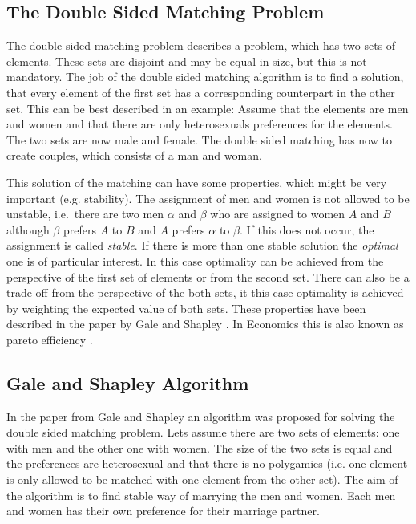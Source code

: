 \label{theory}
\subsection{The Double Sided Matching Problem}
The double sided matching problem describes a problem, which has two sets of elements.
These sets are disjoint and may be equal in size, but this is not mandatory.
The job of the double sided matching algorithm is to find a solution, that every element of the first set has a corresponding counterpart in the other set. This can be best described in an example:
Assume that the elements are men and women and that there are only heterosexuals preferences for the elements.
The two sets are now male and female.
The double sided matching has now to create couples, which consists of a man and woman.

This solution of the matching can have some properties, which might be very important (e.g. stability).
The assignment of men and women is not allowed to be unstable, i.e.\ there are two men $\alpha$ and $\beta$ who are assigned to women $A$ and $B$ although $\beta$ prefers $A$ to $B$ and $A$ prefers $\alpha$ to $\beta$.
If this does not occur, the assignment is called \textit{stable}.
If there is more than one stable solution the \textit{optimal} one is of particular interest.
In this case optimality can be achieved from the perspective of the first set of elements or from the second set.
There can also be a trade-off from the perspective of the both sets, it this case optimality is achieved by weighting the expected value of both sets.
These properties have been described in the paper by Gale and Shapley \cite{gale62a}.
In Economics this is also known as pareto efficiency \cite[p. 46]{9780199297818}.


\subsection{Gale and Shapley Algorithm}

In the paper from Gale and Shapley \cite{gale62a} an algorithm was proposed for solving the double sided matching problem.
Lets assume there are two sets of elements: one with men and the other one with women.
The size of the two sets is equal and the preferences are heterosexual and that there is no polygamies (i.e. one element is only allowed to be matched with one element from the other set).
The aim of the algorithm is to find stable way of marrying the men and women.
Each men and women has their own preference for their marriage partner.

